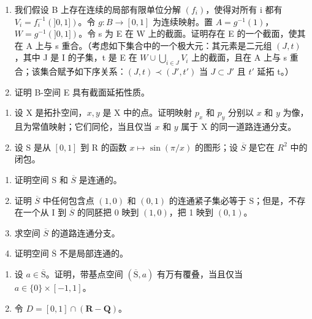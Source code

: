 \begin{enumerate}
\def\labelenumi{\alph{enumi})}
\item
  我们假设 B 上存在连续的局部有限单位分解 \((f_{i})\)，使得对所有 i 都有 \(V_{i} = f_{i}^{-1}(]0,1])\)。令 \(g: B \to [0,1]\) 为连续映射。置 \(A = g^{-1}(1)\)，\(W = g^{-1}(]0,1])\)。令 s 为 E 在 W 上的截面。证明存在 E 的一个截面，使其在 A 上与 s 重合。（考虑如下集合中的一个极大元：其元素是二元组 \((J,t)\)，其中 J 是 I 的子集，t 是 E 在 \(W \cup \bigcup_{i \in J} V_{i}\) 上的截面，且在 A 上与 s 重合；该集合赋予如下序关系：\((J,t) \prec (J',t')\) 当 \(J \subset J'\) 且 \(t'\) 延拓 t。）
\item
  证明 B-空间 E 具有截面延拓性质。
\end{enumerate}

\exercisegroup

\begin{enumerate}
\def\labelenumi{\arabic{enumi})}
\item
 设 X 是拓扑空间，\(x, y\) 是 X 中的点。证明映射 \(p_x\) 和 \(p_y\) 分别以 \(x\) 和 \(y\) 为像，且为常值映射；它们同伦，当且仅当 \(x\) 和 \(y\) 属于 X 的同一道路连通分支。
\item
  设 S 是从 \([0,1]\) 到 R 的函数 \(x \mapsto \sin(\pi/x)\) 的图形；设 \(\overline{S}\) 是它在 \(R^{2}\) 中的闭包。
\end{enumerate}

\begin{enumerate}
\def\labelenumi{\alph{enumi})}
\item
  证明空间 S 和 \(\overline{S}\) 是连通的。
\item
  证明 \(\overline{S}\) 中任何包含点 \((1,0)\) 和 \((0,1)\) 的连通紧子集必等于 S；但是，不存在一个从 I 到 \(\overline{S}\) 的同胚把 0 映到 \((1,0)\)，把 1 映到 \((0,1)\)。
\item
  求空间 \(\overline{S}\) 的道路连通分支。
\item
  证明空间 \(\overline{\mathrm{S}}\) 不是局部连通的。
\end{enumerate}

\begin{enumerate}
\def\labelenumi{\arabic{enumi})}
\setcounter{enumi}{2}
\item
  设 \(a \in \overline{\mathrm{S}}\)。证明，带基点空间 \((\overline{\mathrm{S}}, a)\) 有万有覆叠，当且仅当 \(a \in \{0\} \times [-1, 1]\)。
\item
  令 \(D = [0, 1] \cap (\mathbf{R} - \mathbf{Q})\)。
\end{enumerate}

